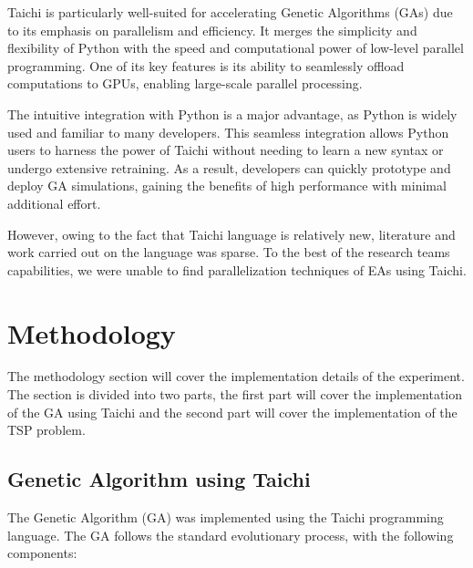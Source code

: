 \documentclass[conference]{IEEEtran}
\begin{document}
Taichi is particularly well-suited for accelerating Genetic Algorithms (GAs)
due to its emphasis on parallelism and efficiency. It merges the simplicity and
flexibility of Python with the speed and computational power of low-level
parallel programming. One of its key features is its ability to seamlessly
offload computations to GPUs, enabling large-scale parallel processing.

The intuitive integration with Python is a major advantage, as Python is widely
used and familiar to many developers. This seamless integration allows Python
users to harness the power of Taichi without needing to learn a new syntax or
undergo extensive retraining. As a result, developers can quickly prototype and
deploy GA simulations, gaining the benefits of high performance with minimal
additional effort.

However, owing to the fact that Taichi language is relatively new, literature
and work carried out on the language was sparse. To the best of the research
teams capabilities, we were unable to find parallelization techniques of EAs
using Taichi.

\section{Methodology}
The methodology section will cover the implementation details of the
experiment. The section is divided into two parts, the first part will cover
the implementation of the GA using Taichi and the second part will cover the
implementation of the TSP problem.

\subsection{Genetic Algorithm using Taichi}
The Genetic Algorithm (GA) was implemented using the Taichi programming
language. The GA follows the standard evolutionary process, with the following
components:
\end{document}
